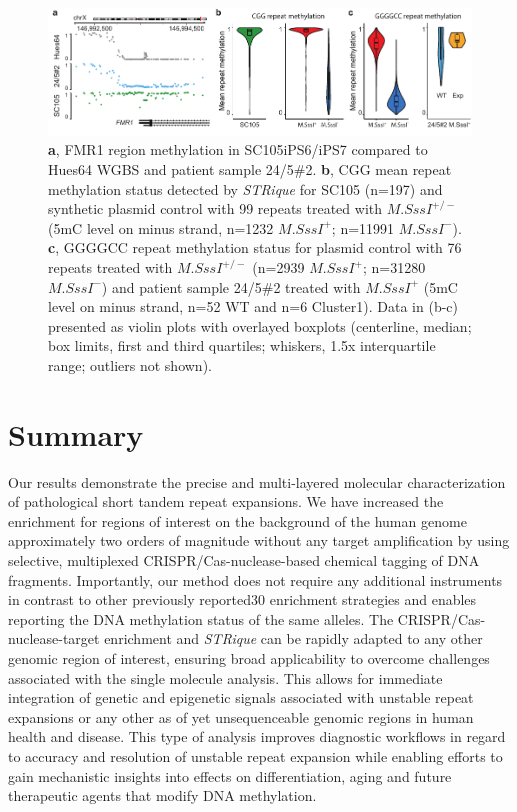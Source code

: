 \begin{figure}[h]
    \centering
    \includegraphics[width=1.0\textwidth]{figures/strique/methylation_repeat.pdf}
    \captionsetup{format=plain}
    \caption[Region and repeat methylation detection]{\textbf{a}, FMR1 region methylation in SC105iPS6/iPS7 compared to Hues64 WGBS and patient sample 24/5\#2. \textbf{b}, CGG mean repeat methylation status detected by \textit{STRique} for SC105 (n=197) and synthetic plasmid control with 99 repeats treated with $ M.SssI^{+/-} $ (5mC level on minus strand, n=1232 $ M.SssI^{+} $; n=11991 $ M.SssI^{-} $). \textbf{c}, GGGGCC repeat methylation status for plasmid control with 76 repeats treated with $ M.SssI^{+/-} $ (n=2939 $ M.SssI^{+} $; n=31280 $ M.SssI^{-} $) and patient sample 24/5\#2 treated with $ M.SssI^{+} $ (5mC level on minus strand, n=52 WT and n=6 Cluster1). Data in (b-c) presented as violin plots with overlayed boxplots (centerline, median; box limits, first and third quartiles; whiskers, 1.5x interquartile range; outliers not shown).}
    \label{fig:strique:methylation_repeat}
\end{figure}




\section{Summary}
\label{sec:strique:summary}

Our results demonstrate the precise and multi-layered molecular characterization of pathological short tandem repeat expansions. We have increased the enrichment for regions of interest on the background of the human genome approximately two orders of magnitude without any target amplification by using selective, multiplexed CRISPR/Cas-nuclease-based chemical tagging of DNA fragments. Importantly, our method does not require any additional instruments in contrast to other previously reported30 enrichment strategies and enables reporting the DNA methylation status of the same alleles. The CRISPR/Cas-nuclease-target enrichment and \textit{STRique} can be rapidly adapted to any other genomic region of interest, ensuring broad applicability to overcome challenges associated with the single molecule analysis. This allows for immediate integration of genetic and epigenetic signals associated with unstable repeat expansions or any other as of yet unsequenceable genomic regions in human health and disease. This type of analysis improves diagnostic workflows in regard to accuracy and resolution of unstable repeat expansion while enabling efforts to gain mechanistic insights into effects on differentiation, aging and future therapeutic agents that modify DNA methylation.


